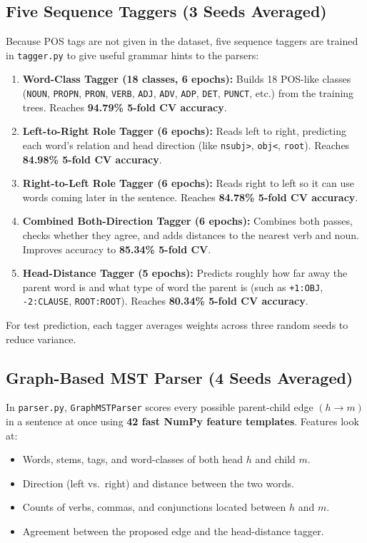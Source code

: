 \documentclass[11pt,a4paper]{article}
\begin{document}
\subsection{Five Sequence Taggers (3 Seeds Averaged)}
Because POS tags are not given in the dataset, five sequence taggers are trained in \texttt{tagger.py} to give useful grammar hints to the parsers:
\begin{enumerate}[noitemsep]
    \item \textbf{Word-Class Tagger (18 classes, 6 epochs):} Builds 18 POS-like classes (\texttt{NOUN}, \texttt{PROPN}, \texttt{PRON}, \texttt{VERB}, \texttt{ADJ}, \texttt{ADV}, \texttt{ADP}, \texttt{DET}, \texttt{PUNCT}, etc.) from the training trees. Reaches \textbf{94.79\% 5-fold CV accuracy}.
    \item \textbf{Left-to-Right Role Tagger (6 epochs):} Reads left to right, predicting each word's relation and head direction (like \texttt{nsubj>}, \texttt{obj<}, \texttt{root}). Reaches \textbf{84.98\% 5-fold CV accuracy}.
    \item \textbf{Right-to-Left Role Tagger (6 epochs):} Reads right to left so it can use words coming later in the sentence. Reaches \textbf{84.78\% 5-fold CV accuracy}.
    \item \textbf{Combined Both-Direction Tagger (6 epochs):} Combines both passes, checks whether they agree, and adds distances to the nearest verb and noun. Improves accuracy to \textbf{85.34\% 5-fold CV}.
    \item \textbf{Head-Distance Tagger (5 epochs):} Predicts roughly how far away the parent word is and what type of word the parent is (such as \texttt{+1:OBJ}, \texttt{-2:CLAUSE}, \texttt{ROOT:ROOT}). Reaches \textbf{80.34\% 5-fold CV accuracy}.
\end{enumerate}
For test prediction, each tagger averages weights across three random seeds to reduce variance.

\subsection{Graph-Based MST Parser (4 Seeds Averaged)}
In \texttt{parser.py}, \texttt{GraphMSTParser} scores every possible parent-child edge $(h \to m)$ in a sentence at once using \textbf{42 fast NumPy feature templates}. Features look at:
\begin{itemize}[noitemsep]
    \item Words, stems, tags, and word-classes of both head $h$ and child $m$.
    \item Direction (left vs.\ right) and distance between the two words.
    \item Counts of verbs, commas, and conjunctions located between $h$ and $m$.
    \item Agreement between the proposed edge and the head-distance tagger.
\end{itemize}
\end{document}
